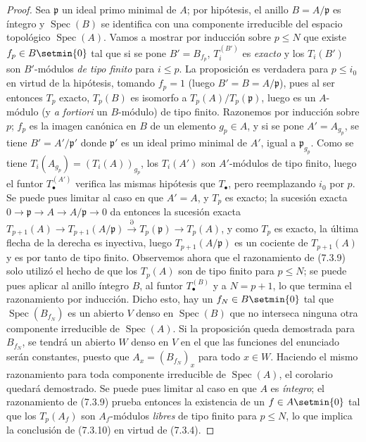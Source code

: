 \begin{proof}
Sea $\mathfrak p$ un ideal primo minimal de $A$; por hipótesis, el anillo
$B=A/\mathfrak p$ es íntegro y $\operatorname{Spec}(B)$ se identifica con una
componente irreducible del espacio topológico $\operatorname{Spec}(A)$. Vamos
a mostrar por inducción sobre $p\leq N$ que existe
$f_p\in B\setmin\{0\}$ tal que si se pone $B'=B_{f_p}$, $T_i^{(B')}$ es \emph{exacto} y
los $T_i(B')$ son $B'$-módulos \emph{de tipo finito} para $i\leq p$. La proposición es
verdadera para $p\leq i_0$ en virtud de la hipótesis, tomando $f_p=1$ (luego
$B'=B=A/\mathfrak p$), pues al ser entonces $T_p$ exacto, $T_p(B)$ es isomorfo a
$T_p(A)/T_p(\mathfrak p)$, luego es un $A$-módulo (y \emph{a fortiori} un
$B$-módulo) de tipo finito. Razonemos por inducción sobre $p$; $f_p$ es la imagen
canónica en $B$ de un elemento $g_p\in A$, y si se pone $A'=A_{g_p}$, se tiene
$B'=A'/\mathfrak p'$ donde $\mathfrak p'$ es un ideal primo minimal de $A'$,
igual a $\mathfrak p_{g_p}$. Como se tiene
$T_i(A_{g_p})=(T_i(A))_{g_p}$,
los $T_i(A')$ son $A'$-módulos de tipo finito, luego el funtor
$T_\bullet^{(A')}$ verifica las mismas hipótesis que $T_\bullet$, pero
reemplazando $i_0$ por $p$. Se puede pues limitar al caso en que $A'=A$, y $T_p$
es exacto; la sucesión exacta
$0\longrightarrow\mathfrak p\longrightarrow A\longrightarrow A/\mathfrak p\longrightarrow0$
da entonces la sucesión exacta
$T_{p+1}(A)\longrightarrow T_{p+1}(A/\mathfrak p)\xrightarrow{\partial}T_p(\mathfrak p)\longrightarrow T_p(A)$,
y como $T_p$ es exacto, la última flecha de la derecha es inyectiva, luego
$T_{p+1}(A/\mathfrak p)$ es un cociente de $T_{p+1}(A)$ y es por tanto de
tipo finito. Observemos ahora que el razonamiento de (7.3.9) solo utilizó el hecho
de que los $T_p(A)$ son de tipo finito para $p\leq N$; se puede pues aplicar
al anillo íntegro $B$, al funtor $T_\bullet^{(B)}$ y a $N=p+1$, lo que
termina el razonamiento por inducción. Dicho esto, hay un
$f_N\in B\setmin\{0\}$ tal que $\operatorname{Spec}(B_{f_N})$ es un abierto $V$
denso en $\operatorname{Spec}(B)$ que no interseca ninguna otra
componente irreducible de $\operatorname{Spec}(A)$. Si la proposición queda
demostrada para $B_{f_N}$, se tendrá un abierto $W$ denso en $V$ en
el que las funciones del enunciado serán constantes, puesto que
$A_x=(B_{f_N})_x$ para todo $x\in W$. Haciendo el mismo razonamiento para
toda componente irreducible de $\operatorname{Spec}(A)$, el corolario quedará
demostrado. Se puede pues limitar al caso en que $A$ es \emph{íntegro}; el razonamiento de
(7.3.9) prueba entonces la existencia de un $f\in A\setmin\{0\}$ tal que los $T_p(A_f)$
son $A_f$-módulos \emph{libres} de tipo finito para $p\leq N$, lo que implica
la conclusión de (7.3.10) en virtud de (7.3.4).
\end{proof}

